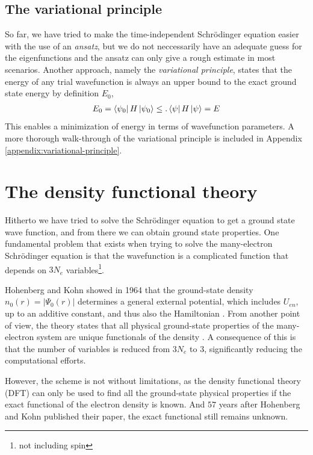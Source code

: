 \subsection{The variational principle}
So far, we have tried to make the time-independent Schrödinger equation easier with the use of an \textit{ansatz}, but we do not neccessarily have an adequate guess for the eigenfunctions and the ansatz can only give a rough estimate in most scenarios. Another approach, namely the \textit{variational principle}, states that the energy of any trial wavefunction is always an upper bound to the exact ground state energy by definition $E_0$,
\begin{align}
  E_0 = \bra{\psi_0 } H \ket{\psi_0} \leq. \bra{\psi}H\ket{\psi} = E
\end{align} This enables a minimization of energy in terms of wavefunction parameters. A more thorough walk-through of the variational principle is included in Appendix \ref{appendix:variational-principle}.

\section{The density functional theory}

Hitherto we have tried to solve the Schrödinger equation to get a ground state wave function, and from there we can obtain ground state properties. One fundamental problem that exists when trying to solve the many-electron Schrödinger equation is that the wavefunction is a complicated function that depends on $3N_e$ variables\footnote{not including spin}.

Hohenberg and Kohn \cite{Hohenberg1964} showed in 1964 that the ground-state density $n_0(r) = \lvert \Psi_0 (r)\rvert$ determines a general external potential, which includes $U_{en}$, up to an additive constant, and thus also the Hamiltonian \cite{Toulouse2019}. From another point of view, the theory states that all physical ground-state properties of the many-electron system are unique functionals of the density \cite{Persson2020}. A consequence of this is that the number of variables is reduced from $3N_e$ to $3$, significantly reducing the computational efforts.

However, the scheme is not without limitations, as the density functional theory (DFT) can only be used to find all the ground-state physical properties if the exact functional of the electron density is known. And $57$ years after Hohenberg and Kohn published their paper, the exact functional still remains unknown.

